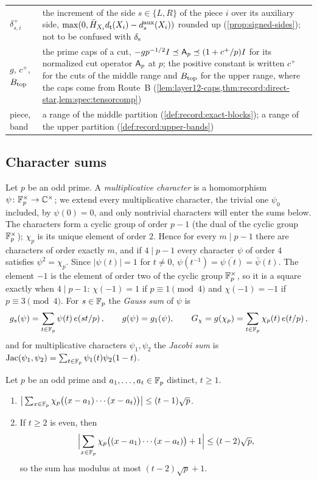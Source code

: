 \begin{longtable}{@{}>{\raggedright\arraybackslash}p{}%
>{\raggedright\arraybackslash}p{}@{}}
$\delta^+_{s,i}$ & the increment of the side $s\in\{L,R\}$ of the piece $i$
 over its auxiliary side, $\max(0,\bar H_{X_i}d_\mathsf t(X_i)-d^{\rm aux}_s(X_i))$
 rounded up (\cref{prop:signed-sides}); not to be confused with $\delta_{\rm s}$\\
$g$, $c^+$, $B_{\rm top}$ & the prime caps of a cut,
 $-gp^{-1/2}I\preceq\mathsf A_p\preceq(1+c^+/p)I$ for its normalized cut operator $\mathsf A_p$ at $p$;
 the positive constant is written $c^+$ for the cuts of the middle range and
 $B_{\rm top}$ for the upper range, where the caps come from Route~B
 (\cref{lem:layer12-caps,thm:record:direct-star,lem:spec:tensorcomp})\\
piece, band & a range of the middle partition (\cref{def:record:exact-blocks});
 a range of the upper partition (\cref{def:record:upper-bands})\\
\end{longtable}
\endgroup

\subsection{Character sums}\label{subsec:prelim:characters}

Let $p$ be an odd prime. A \emph{multiplicative character} is a homomorphism
$\psi\colon\mathbb F_p^\times\to\mathbb C^\times$; we extend every multiplicative character,
the trivial one $\psi_0$ included, by $\psi(0)=0$, and only nontrivial
characters will enter the sums below. The characters form a cyclic group of
order $p-1$ (the dual of the cyclic group $\mathbb F_p^\times$); $\chi_p$ is its
unique element of order $2$. Hence for every $m\mid p-1$ there are characters
of order exactly $m$, and if $4\mid p-1$ every character $\psi$ of order $4$
satisfies $\psi^2=\chi_p$. Since $|\psi(t)|=1$ for $t\ne0$,
$\psi(t^{-1})=\overline{\psi(t)}=\bar\psi(t)$. The element $-1$ is the
element of order two of the cyclic group $\mathbb F_p^\times$, so it is a square
exactly when $4\mid p-1$: $\chi(-1)=1$ if $p\equiv1\pmod4$ and $\chi(-1)=-1$
if $p\equiv3\pmod4$. For $s\in\mathbb F_p$ the \emph{Gauss sum} of $\psi$ is
\[
  g_s(\psi)=\sum_{t\in\mathbb F_p}\psi(t)\,e\!\left(st/p\right),\qquad g(\psi)=g_1(\psi),\qquad
  G_\chi=g(\chi_p)=\sum_{t\in\mathbb F_p}\chi_p(t)\,e\!\left(t/p\right),
\]
and for multiplicative characters $\psi_1,\psi_2$ the \emph{Jacobi sum} is
$\operatorname{Jac}(\psi_1,\psi_2)=\sum_{t\in\mathbb F_p}\psi_1(t)\psi_2(1-t)$.

\begin{theorem}\label{thm:weil}
Let $p$ be an odd prime and $a_1,\dots,a_t\in\mathbb F_p$ distinct, $t\ge1$.
\begin{enumerate}[label=\textup{(\alph*)}]
\item $\big|\sum_{x\in\mathbb F_p}\chi_p\big((x-a_1)\cdots(x-a_t)\big)\big|\le(t-1)\sqrt p$.
\item If $t\ge2$ is even, then
 \[
  \Bigl|\sum_{x\in\mathbb F_p}\chi_p\bigl((x-a_1)\cdots(x-a_t)\bigr)+1\Bigr|\le(t-2)\sqrt p ,
 \]
 so the sum has modulus at most $(t-2)\sqrt p+1$.
\end{enumerate}
\end{theorem}

